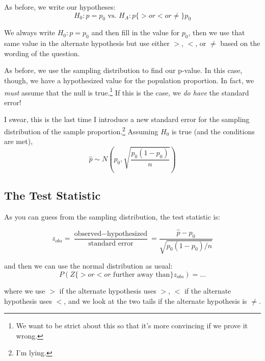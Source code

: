 \documentclass[
  letterpaper,
  DIV=11,
  numbers=noendperiod]{scrreprt}
\begin{document}
As before, we write our hypotheses: \[
H_0:p = p_0 \text{ vs. } H_A: p \{>or<or\ne\} p_0
\]

We always write \(H_0:p = p_0\) and then fill in the value for \(p_0\),
then we use that same value in the alternate hypothesis but use either
\(>\), \(<\), or \(\ne\) based on the wording of the question.

As before, we use the sampling distribution to find our p-value. In this
case, though, we have a hypothesized value for the population
proportion. In fact, we \emph{must} assume that the null is
true.\footnote{We want to be strict about this so that it's more
  convincing if we prove it wrong.} If this is the case, we \emph{do
have} the standard error!

I swear, this is the last time I introduce a new standard error for the
sampling distribution of the sample proportion.\footnote{I'm lying.}
Assuming \(H_0\) is true (and the conditions are met), \[
\hat p \sim N\left(p_0, \sqrt{\frac{p_0(1-p_0)}{n}}\right)
\]

\hypertarget{the-test-statistic}{%
\subsection{The Test Statistic}\label{the-test-statistic}}

As you can guess from the sampling distribution, the test statistic is:

\begin{tcolorbox}[enhanced jigsaw, toptitle=1mm, colbacktitle=quarto-callout-note-color!10!white, breakable, leftrule=.75mm, left=2mm, opacityback=0, colframe=quarto-callout-note-color-frame, rightrule=.15mm, toprule=.15mm, bottomtitle=1mm, titlerule=0mm, title=\textcolor{quarto-callout-note-color}{\faInfo}\hspace{0.5em}{Test Statistic for a Test for Proportions}, arc=.35mm, colback=white, bottomrule=.15mm, opacitybacktitle=0.6, coltitle=black]

\[
z_{obs} = \frac{\text{observed} - \text{hypothesized}}{\text{standard error}} = \frac{\hat p - p_0}{\sqrt{p_0(1-p_0)/n}}
\]

\end{tcolorbox}

and then we can use the normal distribution as usual: \[
P(Z \{>or<or\text{ further away than}\} z_{obs}) = \dots
\]

where we use \(>\) if the alternate hypothesis uses \(>\), \(<\) if the
alternate hypothesis uses \(<\), and we look at the two tails if the
alternate hypothesis is \(\ne\).
\end{document}
